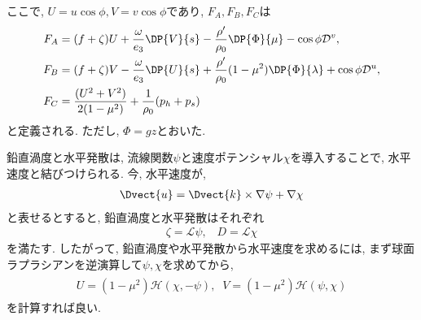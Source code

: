 ここで, $U=u\cos\phi, V=v\cos\phi$であり, 
$F_A, F_B, F_C$は
\begin{equation}
\begin{split}
 F_A &= 
     (f + \zeta) U  + \dfrac{\omega}{e_3}\DP{V}{s}
   - \dfrac{\rho'}{\rho_0}\DP{\Phi}{\mu} - \cos\phi \mathcal{D}^v, \\
 F_B &= 
    (f + \zeta) V - \dfrac{\omega}{e_3}\DP{U}{s}
   +  \dfrac{\rho'}{\rho_0}(1-\mu^2) \DP{\Phi}{\lambda} + \cos\phi\mathcal{D}^u , \\
 F_C &= \dfrac{(U^2 + V^2)}{2(1-\mu^2)} + \dfrac{1}{\rho_0}(p_h + p_s)
\end{split}
\end{equation}
と定義される. ただし, $\Phi=gz$とおいた. 

鉛直渦度と水平発散は, 
流線関数$\psi$と速度ポテンシャル$\chi$を導入することで, 水平速度と結びつけられる. 
今, 水平速度が, 
\begin{align}
  \Dvect{u} = \Dvect{k} \times \nabla \psi + \nabla \chi
\end{align}
と表せるとすると, 鉛直渦度と水平発散はそれぞれ
\begin{align}
  \zeta = \mathscr{L} \psi, \;\;\;
  D = \mathscr{L}  \chi
\label{eq:vordiv_scalarPot_relation_hspm}
\end{align}
を満たす. 
したがって, 鉛直渦度や水平発散から水平速度を求めるには, 
まず球面ラプラシアンを逆演算して$\psi, \chi$を求めてから, 
\begin{align}
\begin{split}
 U =  (1-\mu^2) \mathscr{H} (\chi, -\psi), \;\;
 V = (1-\mu^2) \mathscr{H} (\psi,\chi)
\end{split}
\label{eq:ScalrPot2HoriVec_hspm}
\end{align}
を計算すれば良い. 

